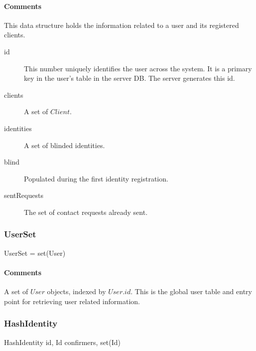 \documentclass[a4paper,10pt]{article}
\begin{document}
\paragraph*{Comments}
This data structure holds the information related to a user and its registered clients.

\SpecialItem
\begin{description}
 \item[id] This number uniquely identifies the user across the system. It is a primary key in the user's table in the server DB. The server generates this id.
 \item[clients] A set of $Client$.
 \item[identities] A set of blinded identities.
 \item[blind] Populated during the first identity registration.
 \item[sentRequests] The set of contact requests already sent.
\end{description}

\subsubsection{UserSet}

\begin{verbbox}
UserSet = set(User)
\end{verbbox}
\begin{center}
\theverbbox
\end{center}

\begin{inparaitem}[ ]
 \item \secure
 \item \persistent
 \item \unique
\end{inparaitem}

\paragraph*{Comments}
A set of $User$ objects, indexed by $User.id$. This is the global user table and entry point for retrieving user related information.

\subsubsection{HashIdentity}

\begin{verbbox}
HashIdentity
{
  id, Id
  confirmers, set(Id)
}
\end{verbbox}
\begin{center}
\theverbbox
\end{center}
\end{document}
